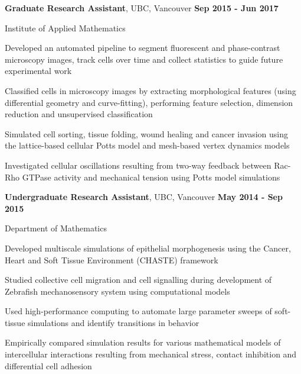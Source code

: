 \documentclass[margin,line]{res}
\newenvironment{list1}{
  \begin{list}{\ding{113}}{
      \setlength{\itemsep}{0in}
      \setlength{\parsep}{0in} \setlength{\parskip}{0in}
      \setlength{\topsep}{0in} \setlength{\partopsep}{0in}
      \setlength{\leftmargin}{0.17in}}}{\end{list}}
\newenvironment{list3}{
  \begin{list}{\textopenbullet}{
      \setlength{\itemsep}{0in}
      \setlength{\parsep}{0in} \setlength{\parskip}{0in}
      \setlength{\topsep}{0in} \setlength{\partopsep}{0in}
      \setlength{\leftmargin}{0.1in}}}{\end{list}}
\begin{document}
\begin{resume}
{\bf Graduate Research Assistant}, UBC, Vancouver \hfill {\bf Sep 2015 - Jun 2017}\\
\vspace*{-.2cm}
\begin{list1}
\item[] Institute of Applied Mathematics
\vspace*{.2cm}
\begin{list3}
\setlength\itemsep{0.5em}
\item Developed an automated pipeline to segment fluorescent and phase-contrast microscopy images, track cells over time and collect statistics to guide future experimental work
\item Classified cells in microscopy images by extracting morphological features (using differential geometry and curve-fitting), performing feature selection, dimension reduction and unsupervised classification
\item Simulated cell sorting, tissue folding, wound healing and cancer invasion using the lattice-based cellular Potts model and mesh-based vertex dynamics models
\item Investigated cellular oscillations resulting from two-way feedback between Rac-Rho GTPase activity and mechanical tension using Potts model simulations
\end{list3}
\end{list1}

{\bf Undergraduate Research Assistant}, UBC, Vancouver \hfill {\bf May 2014 - Sep 2015}\\
\vspace*{-.2cm}
\begin{list1}
\item[] Department of Mathematics
\vspace*{.2cm}
\begin{list3}
\setlength\itemsep{0.5em}
\item Developed multiscale simulations of epithelial morphogenesis using the Cancer, Heart and Soft Tissue Environment (CHASTE) framework
\item Studied collective cell migration and cell signalling during development of Zebrafish mechanosensory system using computational models
\item Used high-performance computing to automate large parameter sweeps of soft-tissue simulations and identify transitions in behavior
\item Empirically compared simulation results for various mathematical models of intercellular interactions resulting from mechanical stress, contact inhibition and differential cell adhesion
\end{list3}
\end{list1}
\vspace*{.2cm}


\end{resume}
\end{document}
